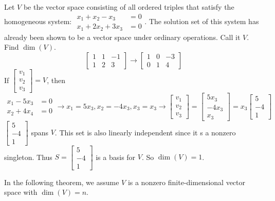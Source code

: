 \documentclass[12pt]{article}
\begin{document}
\begin{example} Let $V$ be the vector space consisting of all ordered triples that satisfy the homogeneous system: $\begin{aligned} x_1 + x_2 - x_3 &= 0 \\ x_1 + 2x_2 + 3x_3 &= 0 \end{aligned}$. The solution set of this system has already been shown to be a vector space under ordinary operations. Call it $V$. Find $\dim(V)$. 
$$ \begin{bmatrix} 1 & 1 & -1 \\ 1 & 2 & 3 \end{bmatrix} \rightarrow \begin{bmatrix} 1 & 0 & -3 \\ 0 & 1 & 4 \end{bmatrix}$$ If $\begin{bmatrix} v_1 \\ v_2 \\ v_3 \end{bmatrix} = V$, then $$\begin{aligned} x_1 - 5x_3 &= 0 \\ x_2 + 4x_4 &= 0 \end{aligned} \rightarrow x_1 = 5x_3, x_2 = -4x_3, x_3 = x_3 \rightarrow \begin{bmatrix} v_1 \\ v_2 \\ v_3 \end{bmatrix} = \begin{bmatrix} 5x_3 \\ -4x_3 \\ x_3 \end{bmatrix} = x_3\begin{bmatrix} 5 \\ -4 \\ 1 \end{bmatrix} $$ $\begin{bmatrix} 5 \\ -4 \\ 1 \end{bmatrix}$ spans $V$. This set is also linearly independent since it s a nonzero singleton. Thus $S = \begin{bmatrix} 5 \\ -4 \\ 1 \end{bmatrix} $ is a basis for $V$. So $\dim(V) = 1$. \end{example} 
In the following theorem, we assume $V$ is a nonzero finite-dimensional vector space with $\dim(V) = n$. 
\end{document}
